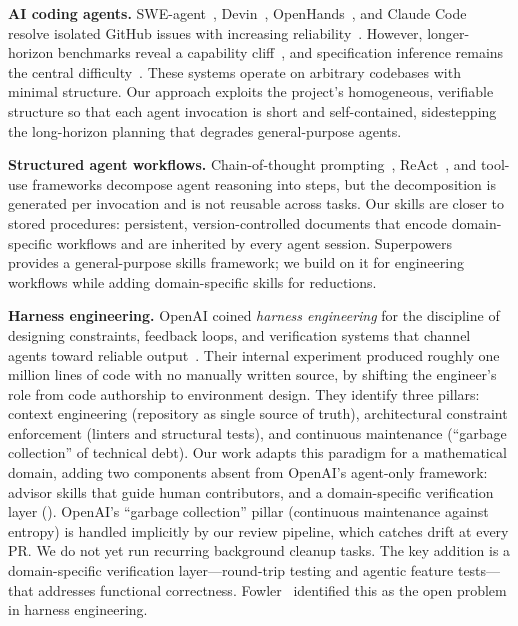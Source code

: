 \documentclass[conference]{IEEEtran}
\begin{document}
\textbf{AI coding agents.}
SWE-agent~\cite{Yang2024SWEagent}, Devin~\cite{Wu2024Devin}, OpenHands~\cite{Wang2024OpenHands}, and Claude Code~\cite{Anthropic2025ClaudeCode} resolve isolated GitHub issues with increasing reliability~\cite{Xia2025LiveSWEagent}.
However, longer-horizon benchmarks reveal a capability cliff~\cite{Thai2025SWEEVO, Deng2025SWEBenchPro}, and specification inference remains the central difficulty~\cite{Roychoudhury2025AgenticAI}.
These systems operate on arbitrary codebases with minimal structure.
Our approach exploits the project's homogeneous, verifiable structure so that each agent invocation is short and self-contained, sidestepping the long-horizon planning that degrades general-purpose agents.

\textbf{Structured agent workflows.}
Chain-of-thought prompting~\cite{Wei2022CoT}, ReAct~\cite{Yao2023ReAct}, and tool-use frameworks decompose agent reasoning into steps, but the decomposition is generated per invocation and is not reusable across tasks.
Our skills are closer to stored procedures: persistent, version-controlled documents that encode domain-specific workflows and are inherited by every agent session.
Superpowers~\cite{Obra2025Superpowers} provides a general-purpose skills framework; we build on it for engineering workflows while adding domain-specific skills for reductions.

\textbf{Harness engineering.}
OpenAI coined \emph{harness engineering} for the discipline of designing constraints, feedback loops, and verification systems that channel agents toward reliable output~\cite{OpenAI2026HarnessEngineering}.
Their internal experiment produced roughly one million lines of code with no manually written source, by shifting the engineer's role from code authorship to environment design.
They identify three pillars: context engineering (repository as single source of truth), architectural constraint enforcement (linters and structural tests), and continuous maintenance (``garbage collection'' of technical debt).
Our work adapts this paradigm for a mathematical domain, adding two components absent from OpenAI's agent-only framework: advisor skills that guide human contributors, and a domain-specific verification layer ().
OpenAI's ``garbage collection'' pillar (continuous maintenance against entropy) is handled implicitly by our review pipeline, which catches drift at every PR.
We do not yet run recurring background cleanup tasks.
The key addition is a domain-specific verification layer---round-trip testing and agentic feature tests---that addresses functional correctness.
Fowler~\cite{Fowler2026HarnessLimits} identified this as the open problem in harness engineering.
\end{document}
